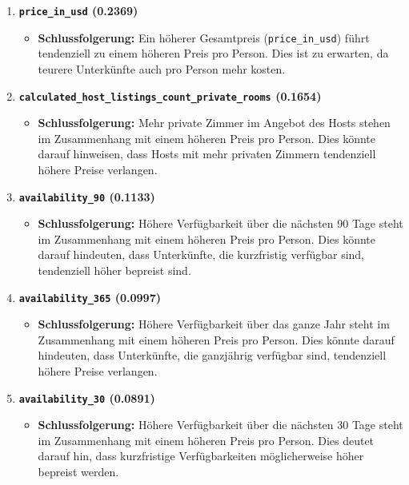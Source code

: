 \documentclass[
  journal,
]{IEEEtran}%
\providecommand{\tightlist}{%
  \setlength{\itemsep}{0pt}\setlength{\parskip}{0pt}}\usepackage{longtable,booktabs,array}
\begin{document}
\begin{enumerate}
\def\labelenumi{\arabic{enumi}.}
\item
  \textbf{\texttt{price\_in\_usd} (0.2369)}

  \begin{itemize}
  \tightlist
  \item
    \textbf{Schlussfolgerung:} Ein höherer Gesamtpreis
    (\texttt{price\_in\_usd}) führt tendenziell zu einem höheren Preis
    pro Person. Dies ist zu erwarten, da teurere Unterkünfte auch pro
    Person mehr kosten.
  \end{itemize}
\item
  \textbf{\texttt{calculated\_host\_listings\_count\_private\_rooms}
  (0.1654)}

  \begin{itemize}
  \tightlist
  \item
    \textbf{Schlussfolgerung:} Mehr private Zimmer im Angebot des Hosts
    stehen im Zusammenhang mit einem höheren Preis pro Person. Dies
    könnte darauf hinweisen, dass Hosts mit mehr privaten Zimmern
    tendenziell höhere Preise verlangen.
  \end{itemize}
\item
  \textbf{\texttt{availability\_90} (0.1133)}

  \begin{itemize}
  \tightlist
  \item
    \textbf{Schlussfolgerung:} Höhere Verfügbarkeit über die nächsten 90
    Tage steht im Zusammenhang mit einem höheren Preis pro Person. Dies
    könnte darauf hindeuten, dass Unterkünfte, die kurzfristig verfügbar
    sind, tendenziell höher bepreist sind.
  \end{itemize}
\item
  \textbf{\texttt{availability\_365} (0.0997)}

  \begin{itemize}
  \tightlist
  \item
    \textbf{Schlussfolgerung:} Höhere Verfügbarkeit über das ganze Jahr
    steht im Zusammenhang mit einem höheren Preis pro Person. Dies
    könnte darauf hindeuten, dass Unterkünfte, die ganzjährig verfügbar
    sind, tendenziell höhere Preise verlangen.
  \end{itemize}
\item
  \textbf{\texttt{availability\_30} (0.0891)}

  \begin{itemize}
  \tightlist
  \item
    \textbf{Schlussfolgerung:} Höhere Verfügbarkeit über die nächsten 30
    Tage steht im Zusammenhang mit einem höheren Preis pro Person. Dies
    deutet darauf hin, dass kurzfristige Verfügbarkeiten möglicherweise
    höher bepreist werden.
  \end{itemize}
\end{enumerate}
\end{document}

